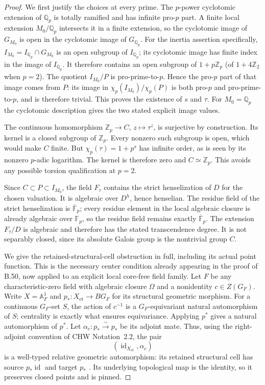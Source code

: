 \begin{proof}
We first justify the choices at every prime.
The $p$-power cyclotomic extension of $\mathbb Q_p$
is totally ramified and has infinite pro-$p$ part.
A finite local extension $M_0/\mathbb Q_p$ intersects
it in a finite extension, so the cyclotomic image of
$G_{M_0}$ is open in the cyclotomic image of
$G_{\mathbb Q_p}$.
For the inertia assertion specifically,
$I_{M_0}=I_{\mathbb Q_p}\cap G_{M_0}$ is an open
subgroup of $I_{\mathbb Q_p}$; its cyclotomic image
has finite index in the image of $I_{\mathbb Q_p}$.
It therefore contains an open subgroup of $1+p\mathbb Z_p$
(of $1+4\mathbb Z_2$ when $p=2$).
The quotient $I_{M_0}/P$ is pro-prime-to-$p$.
Hence the pro-$p$ part of that image comes from $P$:
its image in $\chi_p(I_{M_0})/\chi_p(P)$ is both pro-$p$
and pro-prime-to-$p$, and is therefore trivial.
This proves the existence of $s$ and $\tau$.
For $M_0=\mathbb Q_p$ the cyclotomic description gives
the two stated explicit image values.

The continuous homomorphism $\mathbb Z_p\to C$,
$z\mapsto\tau^z$, is surjective by construction.
Its kernel is a closed subgroup of $\mathbb Z_p$.
Every nonzero such subgroup is open, which would make
$C$ finite.
But $\chi_p(\tau)=1+p^s$ has infinite order, as is
seen by its nonzero $p$-adic logarithm.
The kernel is therefore zero and $C\simeq\mathbb Z_p$.
This avoids any possible torsion qualification at $p=2$.

Since $C\subset P\subset I_{M_0}$, the field $F_\tau$
contains the strict henselization of $D$ for the chosen
valuation.  It is algebraic over $D^h$, hence henselian.
The residue field of the strict henselization is
$\overline{\mathbb F}_p$; every residue element in the
local algebraic closure is already algebraic over
$\mathbb F_p$, so the residue field remains exactly
$\overline{\mathbb F}_p$.
The extension $F_\tau/D$ is algebraic and therefore
has the stated transcendence degree.
It is not separably closed, since its absolute
Galois group is the nontrivial group $C$.

We give the retained-structural-cell obstruction
in full, including its actual point function.
This is the necessary center condition already
appearing in the proof of B.50, now applied to an
explicit local core-free field family.
Let $F$ be any characteristic-zero field with algebraic
closure $\Omega$ and a nonidentity
$c\in Z(G_F)$.
Write $X=\mathbb A^1_F$ and
$p_*:X_{\mathrm{et}}\to BG_F$ for its structural
geometric morphism.
For a continuous $G_F$-set $S$, the action of $c^{-1}$
is a $G_F$-equivariant natural automorphism of $S$;
centrality is exactly what ensures equivariance.
Applying $p^*$ gives a natural automorphism of $p^*$.
Let $\alpha_c:p_*\xrightarrow{\sim}p_*$ be its
adjoint mate.
Thus, using the right-adjoint convention of
CHW Notation~2.2, the pair
\[
                  (\operatorname{id}_{X_{\mathrm{et}}},\alpha_c)
                                                               \tag{META.PC3}
\]
is a well-typed relative geometric automorphism:
its retained structural cell has source
$p_*\operatorname{id}$ and target $p_*$
\citep[Notation~2.2]{AN_CHW2024}.
Its underlying topological map is the identity,
so it preserves closed points and is pinned.


\end{proof}
